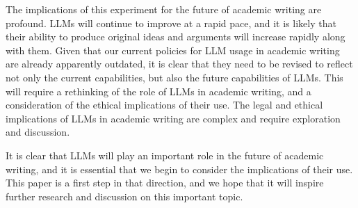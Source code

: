 The implications of this experiment for the future of academic writing are
profound. LLMs will continue to improve at a rapid pace, and it is likely that 
their ability to produce original ideas and arguments will increase rapidly
along with them. Given that our current policies for LLM usage in academic
writing are already apparently outdated, it is clear that they need to be 
revised to reflect not only the current capabilities, but also the future
capabilities of LLMs. This will require a rethinking of the role of LLMs in
academic writing, and a consideration of the ethical implications of their use.
The legal and ethical implications of LLMs in academic writing are complex and
require exploration and discussion. 

It is clear that LLMs will play an important role in the future of academic 
writing, and it is essential that we begin to consider the implications of their
use. This paper is a first step in that direction, and we hope that it will
inspire further research and discussion on this important topic.

